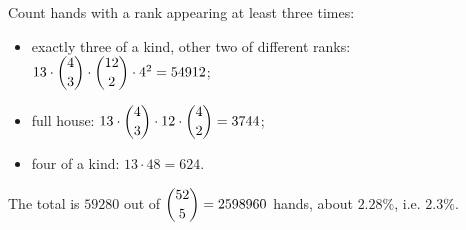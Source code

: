 Count hands with a rank appearing at least three times:
\begin{itemize}
\item exactly three of a kind, other two of different ranks: $13\cdot\dbinom43\cdot\dbinom{12}{2}\cdot4^2=54912$;
\item full house: $13\cdot\dbinom43\cdot12\cdot\dbinom42=3744$;
\item four of a kind: $13\cdot48=624$.
\end{itemize}
The total is $59280$ out of $\dbinom{52}{5}=2598960$ hands, about $2.28\%$, i.e. $\boxed{2.3\%}$.
